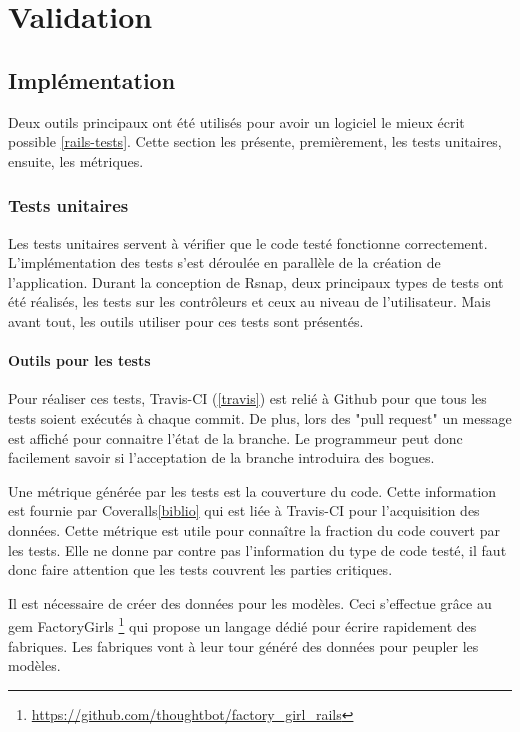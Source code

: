 \chapter{Validation}

\section{Implémentation}
Deux outils principaux ont été utilisés pour avoir un logiciel le mieux écrit possible \ref{rails-tests}. Cette section les présente, premièrement, les tests unitaires, ensuite, les métriques.

\subsection{Tests unitaires}
Les tests unitaires servent à vérifier que le code testé fonctionne correctement. L'implémentation des tests s'est déroulée en parallèle de la création de l'application. Durant la conception de Rsnap, deux principaux types de tests ont été réalisés, les tests sur les contrôleurs et ceux au niveau de l'utilisateur. Mais avant tout, les outils utiliser pour ces tests sont présentés.

\subsubsection{Outils pour les tests}
Pour réaliser ces tests, Travis-CI (\ref{travis}) est relié à Github pour que tous les tests soient exécutés à chaque commit. De plus, lors des "pull request" un message est affiché pour connaitre l'état de la branche. Le programmeur peut donc facilement savoir si l'acceptation de la branche introduira des bogues.

Une métrique générée par les tests est la couverture du code. Cette information est fournie par Coveralls\ref{biblio} qui est liée à Travis-CI pour l'acquisition des données. Cette métrique est utile pour connaître la fraction du code couvert par les tests. Elle ne donne par contre pas l'information du type de code testé, il faut donc faire attention que les tests couvrent les parties critiques.

Il est nécessaire de créer des données pour les modèles. Ceci s'effectue grâce au gem FactoryGirls \footnote{\url{https://github.com/thoughtbot/factory_girl_rails}} qui propose un langage dédié pour écrire rapidement des fabriques. Les fabriques vont à leur tour généré des données pour peupler les modèles.

